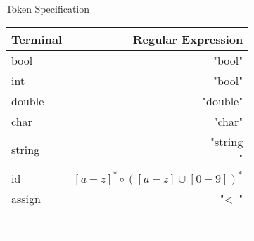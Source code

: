 
Token Specification 

\begin{tabular}{l r}
\item Terminal & Regular Expression \\ \hline
\item bool & "bool" \\
\item int & "bool" \\
\item double & "double" \\
\item char & "char" \\
\item string & "string\[ \]" \\
\item id & $[a-z]^*\circ  ([a-z] \cup [0-9])^*$\\
\item assign & "<--" \\
\item  &  \\
\item  &  \\
\item  &  \\
\item  &  \\
\item  &  \\
\item  &  \\
\end{tabular}